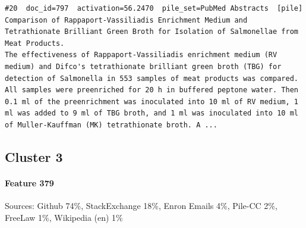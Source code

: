 \begin{verbatim}
#20  doc_id=797  activation=56.2470  pile_set=PubMed Abstracts  [pile]
Comparison of Rappaport-Vassiliadis Enrichment Medium and Tetrathionate Brilliant Green Broth for Isolation of Salmonellae from Meat Products.
The effectiveness of Rappaport-Vassiliadis enrichment medium (RV medium) and Difco's tetrathionate brilliant green broth (TBG) for detection of Salmonella in 553 samples of meat products was compared. All samples were preenriched for 20 h in buffered peptone water. Then 0.1 ml of the preenrichment was inoculated into 10 ml of RV medium, 1 ml was added to 9 ml of TBG broth, and 1 ml was inoculated into 10 ml of Muller-Kauffman (MK) tetrathionate broth. A ...

\end{verbatim}

\subsection*{Cluster 3}

\paragraph*{Feature 379} Sources: Github 74\%, StackExchange 18\%, Enron Emails 4\%, Pile-CC 2\%, FreeLaw 1\%, Wikipedia (en) 1\%

